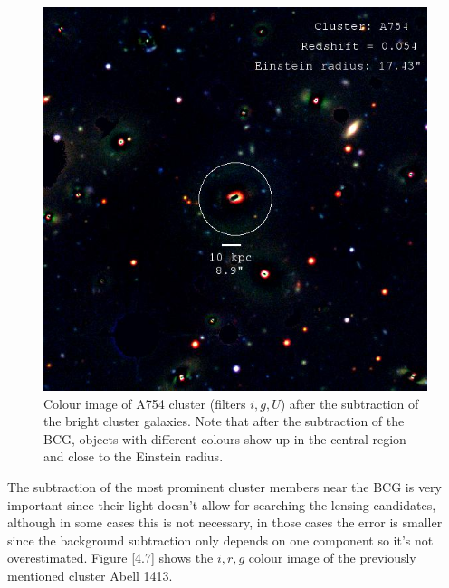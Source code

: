 \begin{figure}[H]
\centering
\includegraphics[width=12cm]{images/cA754_galfit.jpg}
\caption[Colour image of A754 after fitting the bright objects]{Colour image of A754 cluster (filters $i,g,U$) after the subtraction of the bright cluster galaxies. Note that after the subtraction of the BCG, objects with different colours show up in the central region and close to the Einstein radius.}
\end{figure}

The subtraction of the most prominent cluster members near the BCG is very important since their light doesn't allow for searching the lensing candidates, although in some cases this is not necessary, in those cases the error is smaller since the background subtraction only depends on one component so it's not overestimated. Figure [4.7] shows the $i,r,g$ colour image of the previously mentioned cluster Abell 1413. 

